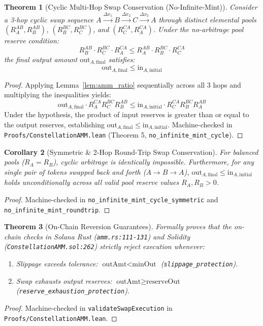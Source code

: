 \documentclass[11pt,a4paper]{article}
\theoremstyle{plain}
\newtheorem{theorem}{Theorem}[section]
\newtheorem{corollary}[theorem]{Corollary}
\theoremstyle{definition}
\theoremstyle{remark}
\begin{document}
\begin{theorem}[Cyclic Multi-Hop Swap Conservation (No-Infinite-Mint)]
\label{thm:amm_cycle}
Consider a 3-hop cyclic swap sequence $A \xrightarrow{\Delta x_1} B \xrightarrow{\Delta x_2} C \xrightarrow{\Delta x_3} A$ through distinct elemental pools $(R_A^{AB}, R_B^{AB})$, $(R_B^{BC}, R_C^{BC})$, and $(R_C^{CA}, R_A^{CA})$. Under the no-arbitrage pool reserve condition:
\begin{equation}
    R_B^{AB} \cdot R_C^{BC} \cdot R_A^{CA} \le R_A^{AB} \cdot R_B^{BC} \cdot R_C^{CA}
\end{equation}
the final output amount $\text{out}_{A,\text{final}}$ satisfies:
\begin{equation}
    \text{out}_{A,\text{final}} \le \text{in}_{A,\text{initial}}
\end{equation}
\end{theorem}
\begin{proof}
Applying Lemma~\ref{lem:amm_ratio} sequentially across all 3 hops and multiplying the inequalities yields:
$$\text{out}_{A,\text{final}} \cdot R_A^{CA} R_C^{BC} R_B^{AB} \le \text{in}_{A,\text{initial}} \cdot R_C^{CA} R_B^{BC} R_A^{AB}$$
Under the hypothesis, the product of input reserves is greater than or equal to the output reserves, establishing $\text{out}_{A,\text{final}} \le \text{in}_{A,\text{initial}}$. Machine-checked in \texttt{Proofs/ConstellationAMM.lean} (Theorem 5, \texttt{no\_infinite\_mint\_cycle}).
\end{proof}

\begin{corollary}[Symmetric \& 2-Hop Round-Trip Swap Conservation]
\label{cor:amm_symmetric}
For balanced pools ($R_A = R_B$), cyclic arbitrage is identically impossible. Furthermore, for any single pair of tokens swapped back and forth ($A \to B \to A$), $\text{out}_{A,\text{final}} \le \text{in}_{A,\text{initial}}$ holds unconditionally across all valid pool reserve values $R_A, R_B > 0$.
\end{corollary}
\begin{proof}
Machine-checked in \texttt{no\_infinite\_mint\_cycle\_symmetric} and \texttt{no\_infinite\_mint\_roundtrip}.
\end{proof}

\begin{theorem}[On-Chain Reversion Guarantees]
\label{thm:reversion_guarantees}
Formally proves that the on-chain checks in Solana Rust (\texttt{amm.rs:111-131}) and Solidity (\texttt{ConstellationAMM.sol:262}) strictly reject execution whenever:
\begin{enumerate}
    \item Slippage exceeds tolerance: $\text{outAmt} < \text{minOut}$ (\texttt{slippage\_protection}).
    \item Swap exhausts output reserves: $\text{outAmt} \ge \text{reserveOut}$ (\texttt{reserve\_exhaustion\_protection}).
\end{enumerate}
\end{theorem}
\begin{proof}
Machine-checked in \texttt{validateSwapExecution} in \texttt{Proofs/ConstellationAMM.lean}.
\end{proof}
\end{document}
